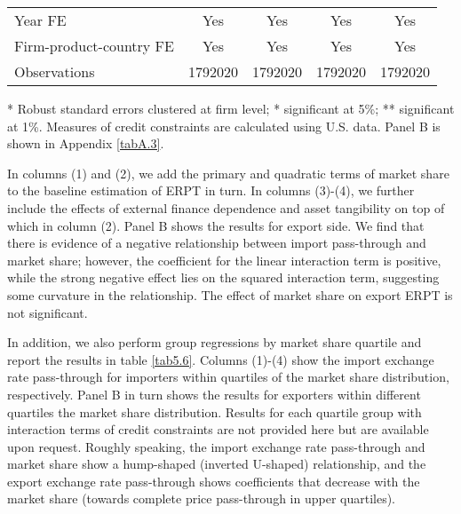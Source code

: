 \begin{table}[tbp]
\begin{threeparttable}
\begin{tabular}{lcccc}
		Year FE  & Yes   & Yes   & Yes   & Yes \\
		Firm-product-country FE & Yes   & Yes   & Yes   & Yes \\
		Observations & 1792020 & 1792020 & 1792020 & 1792020 \\
		\bottomrule
	\end{tabular}
	\begin{tablenotes}
	\footnotesize
	\item[*] Robust standard errors clustered at firm level; * significant at 5\%; ** significant at 1\%. Measures of credit constraints are calculated using U.S. data. Panel B is shown in Appendix \ref{tabA.3}.
	\end{tablenotes}
	\end{threeparttable}
	\label{tab5.5}
\end{table}

In columns (1) and (2), we add the primary and quadratic terms of market share to the baseline estimation of ERPT in turn. In columns (3)-(4), we further include the effects of external finance dependence and asset tangibility on top of which in column (2). Panel B shows the results for export side. We find that there is evidence of a negative relationship between import pass-through and market share; however, the coefficient for the linear interaction term is positive, while the strong negative effect lies on the squared interaction term, suggesting some curvature in the relationship. The effect of market share on export ERPT is not significant. 

In addition, we also perform group regressions by market share quartile and report the results in table \ref{tab5.6}. Columns (1)-(4) show the import exchange rate pass-through for importers within quartiles of the market share distribution, respectively. Panel B in turn shows the results for exporters within different quartiles the market share distribution. Results for each quartile group with interaction terms of credit constraints are not provided here but are available upon request. Roughly speaking, the import exchange rate pass-through and market share show a hump-shaped (inverted U-shaped) relationship, and the export exchange rate pass-through shows coefficients that decrease with the market share (towards complete price pass-through in upper quartiles).

